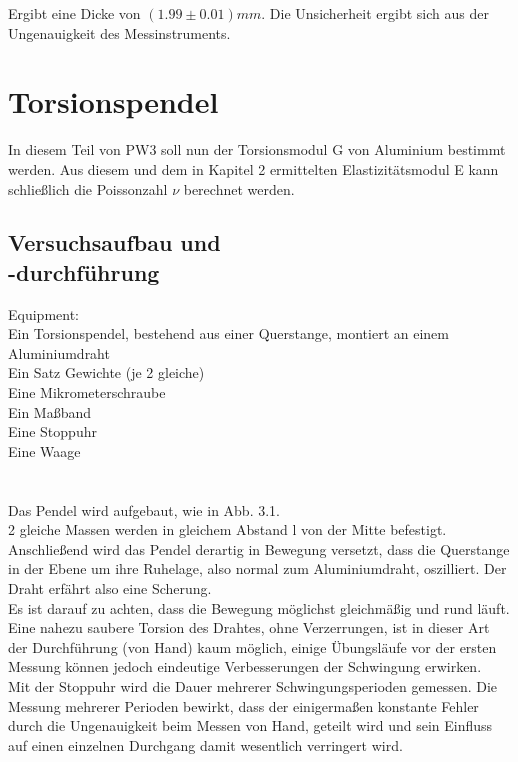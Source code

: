 \documentclass[12pt,a4paper]{article}
\begin{document}
\begin{multicols}{2}

Ergibt eine Dicke von \textbf{$(1.99 \pm 0.01)mm$}. Die Unsicherheit ergibt sich aus der Ungenauigkeit des Messinstruments.\\



\section{Torsionspendel}
In diesem Teil von PW3 soll nun der Torsionsmodul G von Aluminium bestimmt werden. Aus diesem und dem in Kapitel 2 ermittelten Elastizitätsmodul E kann schließlich die Poissonzahl $\nu $ berechnet werden.\\
\subsection{Versuchsaufbau und \\-durchführung}
Equipment:\\
Ein Torsionspendel, bestehend aus einer Querstange, montiert an einem Aluminiumdraht\\
Ein Satz Gewichte (je 2 gleiche)\\
Eine Mikrometerschraube\\
Ein Maßband\\
Eine Stoppuhr\\
Eine Waage\\
\\
\\
Das Pendel wird aufgebaut, wie in Abb. 3.1.\\
2 gleiche Massen werden in gleichem Abstand l von der Mitte befestigt. Anschließend wird das Pendel derartig in Bewegung versetzt, dass die Querstange in der Ebene um ihre Ruhelage, also normal zum Aluminiumdraht, oszilliert. Der Draht erfährt also eine Scherung.\\
Es ist darauf zu achten, dass die Bewegung möglichst gleichmäßig und rund läuft. Eine nahezu saubere Torsion des Drahtes, ohne Verzerrungen, ist in dieser Art der Durchführung (von Hand) kaum möglich, einige Übungsläufe vor der ersten Messung können jedoch eindeutige Verbesserungen der Schwingung erwirken.\\
Mit der Stoppuhr wird die Dauer mehrerer Schwingungsperioden gemessen. Die Messung mehrerer Perioden bewirkt, dass der einigermaßen konstante Fehler durch die Ungenauigkeit beim Messen von Hand, geteilt wird und sein Einfluss auf einen einzelnen Durchgang damit wesentlich verringert wird.\\

\end{multicols}
\end{document}
